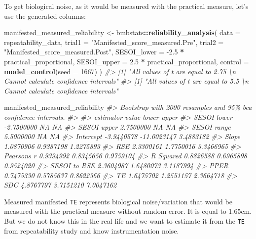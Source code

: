 \documentclass[
]{book}
\newenvironment{Shaded}{\begin{snugshade}}{\end{snugshade}}
\newcommand{\CommentTok}[1]{\textcolor[rgb]{0.56,0.35,0.01}{\textit{#1}}}
\newcommand{\DataTypeTok}[1]{\textcolor[rgb]{0.13,0.29,0.53}{#1}}
\newcommand{\DecValTok}[1]{\textcolor[rgb]{0.00,0.00,0.81}{#1}}
\newcommand{\FloatTok}[1]{\textcolor[rgb]{0.00,0.00,0.81}{#1}}
\newcommand{\KeywordTok}[1]{\textcolor[rgb]{0.13,0.29,0.53}{\textbf{#1}}}
\newcommand{\NormalTok}[1]{#1}
\newcommand{\OperatorTok}[1]{\textcolor[rgb]{0.81,0.36,0.00}{\textbf{#1}}}
\newcommand{\StringTok}[1]{\textcolor[rgb]{0.31,0.60,0.02}{#1}}
\begin{document}
To get biological noise, as it would be measured with the practical measure, let's use the generated columns:

\begin{Shaded}
\begin{Highlighting}[]
\NormalTok{manifested\_measured\_reliability <{-}}\StringTok{ }\NormalTok{bmbstats}\OperatorTok{::}\KeywordTok{reliability\_analysis}\NormalTok{(}
  \DataTypeTok{data =}\NormalTok{ repeatability\_data,}
  \DataTypeTok{trial1 =} \StringTok{"Manifested\_score\_measured.Pre"}\NormalTok{,}
  \DataTypeTok{trial2 =} \StringTok{"Manifested\_score\_measured.Post"}\NormalTok{,}
  \DataTypeTok{SESOI\_lower =} \FloatTok{{-}2.5} \OperatorTok{*}\StringTok{ }\NormalTok{practical\_proportional,}
  \DataTypeTok{SESOI\_upper =} \FloatTok{2.5} \OperatorTok{*}\StringTok{ }\NormalTok{practical\_proportional,}
  \DataTypeTok{control =} \KeywordTok{model\_control}\NormalTok{(}\DataTypeTok{seed =} \DecValTok{1667}\NormalTok{)}
\NormalTok{)}
\CommentTok{\#> [1] "All values of t are equal to  2.75 \textbackslash{}n Cannot calculate confidence intervals"}
\CommentTok{\#> [1] "All values of t are equal to  5.5 \textbackslash{}n Cannot calculate confidence intervals"}

\NormalTok{manifested\_measured\_reliability}
\CommentTok{\#> Bootstrap with 2000 resamples and 95\% bca confidence intervals.}
\CommentTok{\#> }
\CommentTok{\#>     estimator      value       lower     upper}
\CommentTok{\#>   SESOI lower {-}2.7500000          NA        NA}
\CommentTok{\#>   SESOI upper  2.7500000          NA        NA}
\CommentTok{\#>   SESOI range  5.5000000          NA        NA}
\CommentTok{\#>     Intercept {-}3.9440578 {-}11.0023147 3.4883182}
\CommentTok{\#>         Slope  1.0870906   0.9387198 1.2275893}
\CommentTok{\#>           RSE  2.3300161   1.7750016 3.3466965}
\CommentTok{\#>   Pearson\textquotesingle{}s r  0.9394992   0.8345656 0.9759104}
\CommentTok{\#>     R Squared  0.8826588   0.6965898 0.9524020}
\CommentTok{\#>  SESOI to RSE  2.3604987   1.6480073 3.1187994}
\CommentTok{\#>          PPER  0.7475330   0.5785637 0.8622366}
\CommentTok{\#>            TE  1.6475702   1.2551157 2.3664718}
\CommentTok{\#>           SDC  4.8767797   3.7151210 7.0047162}
\end{Highlighting}
\end{Shaded}

Measured manifested \texttt{TE} represents biological noise/variation that would be measured with the practical measure without random error. It is equal to 1.65cm. But we do not know this in the real life and we want to estimate it from the \texttt{TE} from repeatability study and know instrumentation noise.
\end{document}
